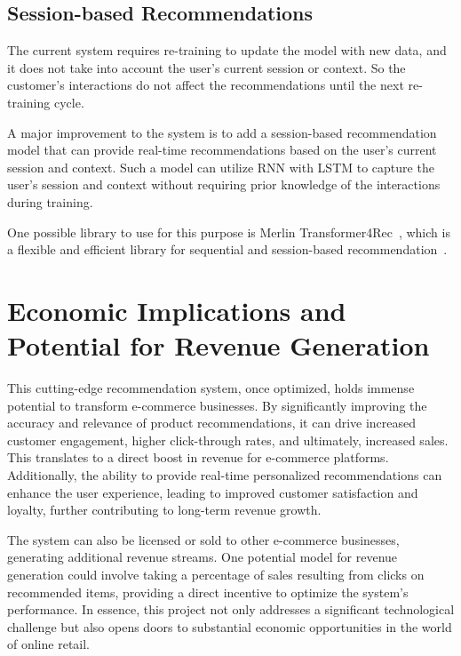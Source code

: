 \subsection{Session-based Recommendations}

The current system requires re-training to update the model with new data, and it does not take into account the user's current session or context.
So the customer's interactions do not affect the recommendations until the next re-training cycle.

A major improvement to the system is to add a session-based recommendation model that can provide real-time recommendations based on the user's current session and context.
Such a model can utilize RNN with LSTM to capture the user's session and context without requiring prior knowledge of the interactions during training. 

One possible library to use for this purpose is Merlin Transformer4Rec~\cite{NvidiaMerlinTransformers4Rec}, 
which is a flexible and efficient library for sequential and session-based recommendation~\cite{NvidiaMerlinTransformers4Rec}.


\section{Economic Implications and Potential for Revenue Generation}

This cutting-edge recommendation system, once optimized, holds immense potential to transform e-commerce businesses. By significantly improving the accuracy and relevance of product recommendations, it can drive increased customer engagement, higher click-through rates, and ultimately, increased sales. This translates to a direct boost in revenue for e-commerce platforms. Additionally, the ability to provide real-time personalized recommendations can enhance the user experience, leading to improved customer satisfaction and loyalty, further contributing to long-term revenue growth. 

The system can also be licensed or sold to other e-commerce businesses, generating additional revenue streams. 
One potential model for revenue generation could involve taking a percentage of sales resulting from clicks on recommended items, providing a direct incentive to optimize the system's performance.
 In essence, this project not only addresses a significant technological challenge but also opens doors to substantial economic opportunities in the world of online retail.